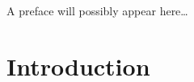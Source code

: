 \documentclass[12pt,mscres,cdtppar,twoside,openright,logo,rightchapter,normalheadings]{infthesis}
\theoremstyle{definition}
\begin{document}
\begin{preliminary}

\begin{preface}
A preface will possibly appear here\dots
\end{preface}

\setcounter{secnumdepth}{2} %
\setcounter{tocdepth}{1} %
\tableofcontents

\end{preliminary}


\chapter{Introduction}
\label{ch:introduction}





\end{document}
